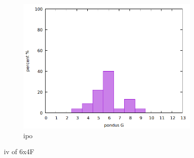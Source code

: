 \begin{figure}
\begin{subfigure}{.3\textwidth}
    \end{subfigure}
    \begin{subfigure}{.3\textwidth}
        \includegraphics[width=\textwidth]{Pics/iv/iv-192-ipo.png}
        \caption{ipo} \label{fig:ipo}
    \end{subfigure}
    \caption{iv of 6x4F} \label{fig:iv}
\end{figure}

